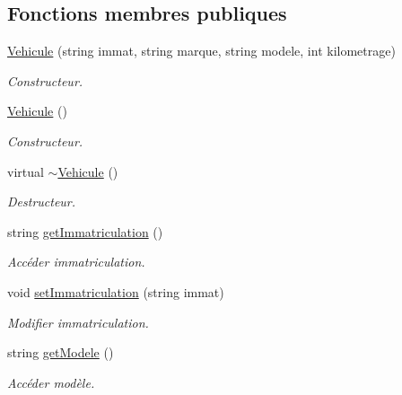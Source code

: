 \subsection*{Fonctions membres publiques}
\begin{DoxyCompactItemize}
\item 
\hyperlink{class_vehicule_a860b5bc4192acc8061b79551e373df02}{Vehicule} (string immat, string marque, string modele, int kilometrage)
\begin{DoxyCompactList}\small\item\em Constructeur. \item\end{DoxyCompactList}\item 
\hyperlink{class_vehicule_ac9352572d0ca9cd4d3138247842c4ce8}{Vehicule} ()
\begin{DoxyCompactList}\small\item\em Constructeur. \item\end{DoxyCompactList}\item 
virtual \hyperlink{class_vehicule_af35800a1c217e3d39e91801932cc35ba}{$\sim$Vehicule} ()
\begin{DoxyCompactList}\small\item\em Destructeur. \item\end{DoxyCompactList}\item 
string \hyperlink{class_vehicule_a5be9ca3e75797e8009f1c9a8bd6f0f58}{getImmatriculation} ()
\begin{DoxyCompactList}\small\item\em Accéder immatriculation. \item\end{DoxyCompactList}\item 
void \hyperlink{class_vehicule_a8a70b407fbeb7cc7359d4c5cc4a11150}{setImmatriculation} (string immat)
\begin{DoxyCompactList}\small\item\em Modifier immatriculation. \item\end{DoxyCompactList}\item 
string \hyperlink{class_vehicule_a61fd72adc19ab2aaa08e3a36775f27ba}{getModele} ()
\begin{DoxyCompactList}\small\item\em Accéder modèle. \item\end{DoxyCompactList}\item 

\end{DoxyCompactItemize}
